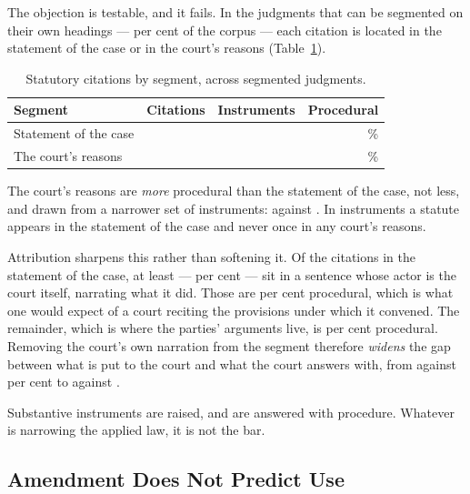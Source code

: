\documentclass[12pt]{article}
\begin{document}
The objection is testable, and it fails. In the \nSegmented{} judgments that
can be segmented on their own headings --- \nSegmentedShare{} per cent of the
corpus --- each citation is located in the statement of the case or in the
court's reasons (Table~\ref{tab:segments}).

\begin{table}[t]
\centering
\singlespacing
\caption{Statutory citations by segment, across \nSegmented{} segmented
judgments.}
\label{tab:segments}
\begin{tabular}{lrrr}
\toprule
Segment & Citations & Instruments & Procedural \\
\midrule
Statement of the case   & \nRecitalCitations{}   & \nRecitalInstruments{}   & \nRecitalProcedural{}\% \\
The court's reasons     & \nReasoningCitations{} & \nReasoningInstruments{} & \nReasoningProcedural{}\% \\
\bottomrule
\end{tabular}
\end{table}

The court's reasons are \emph{more} procedural than the statement of the case,
not less, and drawn from a narrower set of instruments:
\nReasoningInstruments{} against \nRecitalInstruments{}. In
\nRecitalOnlyInstruments{} instruments a statute appears in the statement of
the case and never once in any court's reasons.

Attribution sharpens this rather than softening it. Of the
\nRecitalCitations{} citations in the statement of the case, at least
\nRecitalByCourt{} --- \nRecitalByCourtShare{} per cent --- sit in a sentence
whose actor is the court itself, narrating what it did. Those are
\nRecitalCourtProcedural{} per cent procedural, which is what one would expect
of a court reciting the provisions under which it convened. The remainder,
which is where the parties' arguments live, is \nRecitalOtherProcedural{} per
cent procedural. Removing the court's own narration from the segment
therefore \emph{widens} the gap between what is put to the court and what the
court answers with, from \nRecitalProcedural{} against
\nReasoningProcedural{} per cent to \nRecitalOtherProcedural{} against
\nReasoningProcedural{}.

Substantive instruments are raised, and are answered with procedure. Whatever
is narrowing the applied law, it is not the bar.

\subsection{Amendment Does Not Predict Use}
\end{document}

